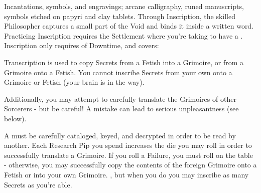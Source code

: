 






Incantations, symbols, and engravings; arcane calligraphy, runed manuscripts, symbols etched on papyri and clay tablets. Through Inscription, the skilled Philosopher captures a small part of the Void and binds it inside a written word. Practicing Inscription requires the Settlement where you're taking  to have a . Inscription only requires  of Downtime, and covers:




Transcription is used to copy Secrets from a Fetish into a Grimoire, or from a Grimoire onto a Fetish. You cannot inscribe Secrets from your own  onto a Grimoire or Fetish (your brain is in the way).

Additionally, you may attempt to carefully translate the Grimoires of other Sorcerers - but be careful! A mistake can lead to serious unpleasantness (see  below).




A  must be carefully cataloged, keyed, and decrypted in order to be read by another. Each Research Pip you spend increases the die you may roll in order to successfully translate a Grimoire. If you roll a Failure, you must roll on the  table - otherwise, you may successfully copy the contents of the foreign Grimoire onto a Fetish or into your own Grimoire. , but when you do you may inscribe as many Secrets as you're able.

